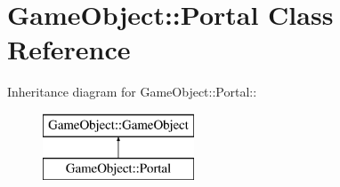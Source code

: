 \hypertarget{classGameObject_1_1Portal}{
\section{GameObject::Portal Class Reference}
\label{classGameObject_1_1Portal}
}
Inheritance diagram for GameObject::Portal::\begin{figure}[H]
\begin{center}
\leavevmode
\includegraphics[height=2cm]{classGameObject_1_1Portal}
\end{center}
\end{figure}
